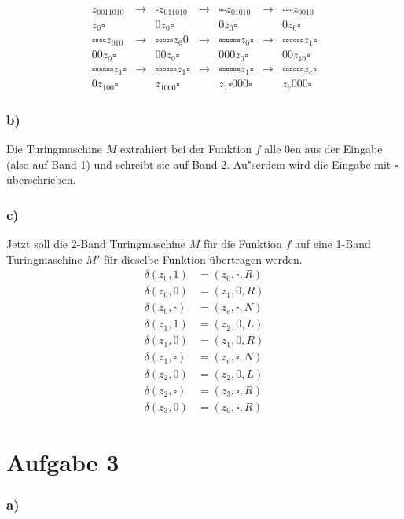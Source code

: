 \documentclass[a4paper,12pt]{article}
\begin{document}
	\begin{align*}
		z_0011010 &\rightarrow &\square z_011010 &\rightarrow &\square \square z_01010 &\rightarrow & \square \square \square z_0010\\
		z_0 \square &  &0 z_0 \square & &0 z_0 \square & &0 z_0 \square\\
		\square \square \square \square z_010 &\rightarrow &\square \square \square \square \square z_0 0 &\rightarrow &\square \square \square \square \square \square z_0 \square &\rightarrow & \square \square \square \square \square \square z_1 \square\\
		00 z_0 \square &  &00 z_0 \square & &000 z_0 \square & &00 z_10 \square\\
		\square \square \square \square  \square \square z_1 \square &\rightarrow &\square \square \square \square  \square \square z_1 \square &\rightarrow &\square \square \square \square \square \square z_1 \square &\rightarrow & \square \square \square \square \square \square z_e \square\\
		0 z_100 \square &  &z_1000 \square & &z_1 \square 000 \square & &z_e000 \square
	\end{align*}
	\subsubsection*{b)}
	Die Turingmaschine $M$ extrahiert bei der Funktion $f$ alle $0$en aus der Eingabe (also auf Band 1) und schreibt sie auf Band 2. Au"serdem wird die Eingabe mit $\square$ überschrieben.\newpage
	
	\subsubsection*{c)}
	Jetzt soll die 2-Band Turingmaschine $M$ für die Funktion $f$ auf eine 1-Band Turingmaschine $M'$ für dieselbe Funktion übertragen werden.
	\begin{align*}
		\delta \left( z_0,1\right) &= \left( z_0, \square, R\right)\\
		\delta \left( z_0,0\right) &= \left( z_1, 0, R\right)\\
		\delta \left( z_0,\square\right) &= \left( z_e, \square, N\right)\\
		\delta \left( z_1,1\right) &= \left( z_2, 0, L\right)\\
		\delta \left( z_1,0\right) &= \left( z_1, 0, R\right)\\
		\delta \left( z_1,\square\right) &= \left( z_e, \square, N\right)\\
		\delta \left( z_2,0\right) &= \left( z_2, 0, L\right)\\
		\delta \left( z_2,\square\right) &= \left( z_3, \square, R\right)\\
		\delta \left( z_3,0\right) &= \left( z_0, \square, R\right)
	\end{align*}
	
	\section*{Aufgabe 3}
	\subsubsection*{a)}
	
	
\end{document}
